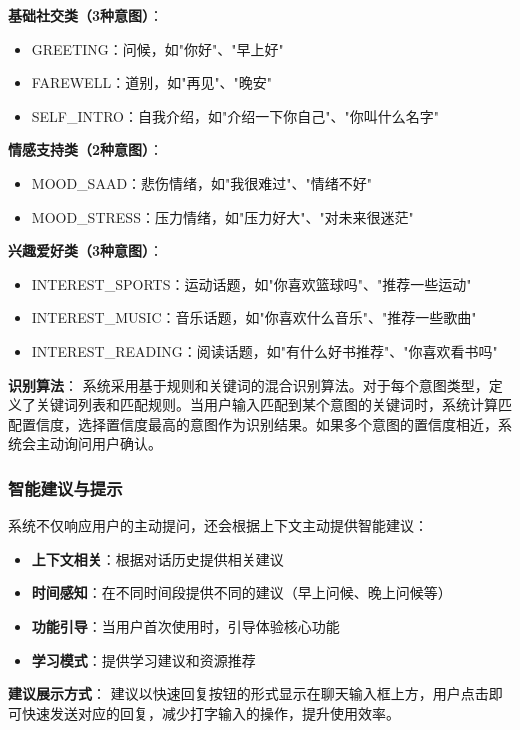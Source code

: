 \documentclass[12pt,a4paper]{article}
\begin{document}
\textbf{基础社交类（3种意图）}：
\begin{itemize}
    \item GREETING：问候，如"你好"、"早上好"
    \item FAREWELL：道别，如"再见"、"晚安"
    \item SELF\_INTRO：自我介绍，如"介绍一下你自己"、"你叫什么名字"
\end{itemize}

\textbf{情感支持类（2种意图）}：
\begin{itemize}
    \item MOOD\_SAAD：悲伤情绪，如"我很难过"、"情绪不好"
    \item MOOD\_STRESS：压力情绪，如"压力好大"、"对未来很迷茫"
\end{itemize}

\textbf{兴趣爱好类（3种意图）}：
\begin{itemize}
    \item INTEREST\_SPORTS：运动话题，如"你喜欢篮球吗"、"推荐一些运动"
    \item INTEREST\_MUSIC：音乐话题，如"你喜欢什么音乐"、"推荐一些歌曲"
    \item INTEREST\_READING：阅读话题，如"有什么好书推荐"、"你喜欢看书吗"
\end{itemize}

\textbf{识别算法}：
系统采用基于规则和关键词的混合识别算法。对于每个意图类型，定义了关键词列表和匹配规则。当用户输入匹配到某个意图的关键词时，系统计算匹配置信度，选择置信度最高的意图作为识别结果。如果多个意图的置信度相近，系统会主动询问用户确认。

\subsubsection{智能建议与提示}

系统不仅响应用户的主动提问，还会根据上下文主动提供智能建议：

\begin{itemize}
    \item \textbf{上下文相关}：根据对话历史提供相关建议
    \item \textbf{时间感知}：在不同时间段提供不同的建议（早上问候、晚上问候等）
    \item \textbf{功能引导}：当用户首次使用时，引导体验核心功能
    \item \textbf{学习模式}：提供学习建议和资源推荐
\end{itemize}

\textbf{建议展示方式}：
建议以快速回复按钮的形式显示在聊天输入框上方，用户点击即可快速发送对应的回复，减少打字输入的操作，提升使用效率。
\end{document}
